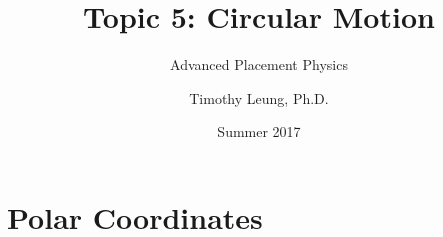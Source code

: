\documentclass[12pt,compress,aspectratio=169]{beamer}
\title{Topic 5: Circular Motion}
\subtitle{Advanced Placement Physics}
\author[TML]{Timothy Leung, Ph.D.}
\institute{Olympiads School}
\date{Summer 2017}
\begin{document}
\begin{frame}
  \maketitle
\end{frame}

%
%


\section{Polar Coordinates}
\end{document}
